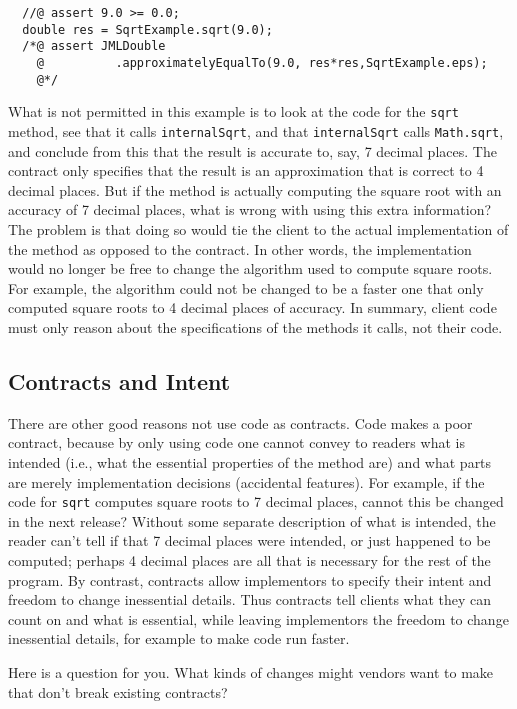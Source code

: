 \documentclass{jotarticle}
\begin{document}
\begin{verbatim}
  //@ assert 9.0 >= 0.0;
  double res = SqrtExample.sqrt(9.0);
  /*@ assert JMLDouble
    @          .approximatelyEqualTo(9.0, res*res,SqrtExample.eps);
    @*/
\end{verbatim}

What is not permitted in this example is to look at the code for the
\texttt{sqrt} method, see that it calls \texttt{internalSqrt}, and
that \texttt{internalSqrt} calls \texttt{Math.sqrt}, and conclude from
this that the result is accurate to, say, 7 decimal places.  The
contract only specifies that the result is an approximation that is
correct to 4 decimal places.  But if the method is actually computing
the square root with an accuracy of 7 decimal places, what is wrong
with using this extra information?  The problem is that doing so would
tie the client to the actual implementation of the method as opposed
to the contract.  In other words, the implementation would no longer
be free to change the algorithm used to compute square roots.
For example, the algorithm could not be changed to be a faster one
that only computed square roots to 4 decimal places of accuracy.
In summary, client code must only reason about the specifications of
the methods it calls, not their code.

\subsection{Contracts and Intent}

There are other good reasons not use code as contracts. Code makes a poor
contract, because by only using code one cannot convey to readers
what is intended (i.e., what the essential properties of the method
are) and what parts are merely implementation decisions (accidental
features).  For example, if the code for \texttt{sqrt} computes square
roots to 7 decimal places, cannot this be changed in the next release?
Without some separate description of what is intended,
the reader can't tell if that 7 decimal places were intended, or just
happened to be computed; perhaps 4 decimal places are all that is
necessary for the rest of the program.
By contrast, contracts allow implementors to specify their
intent and freedom to change inessential details. Thus contracts tell
clients what they can count on and what is essential, while leaving
implementors the freedom to change inessential details, for example
to make code run faster.

Here is a question for you. What kinds of changes might vendors want
to make that don't break existing contracts?
\end{document}

